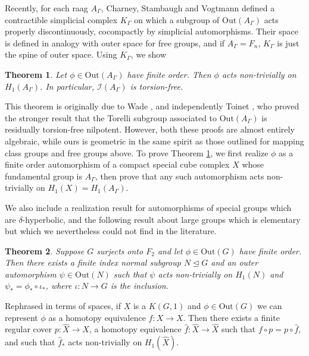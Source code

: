 \documentclass[11pt]{amsart}
\newtheorem{thm}{Theorem}
\numberwithin{thm}{section}
\theoremstyle{remark}
\theoremstyle{definition}
\newcommand{\Z}{\mathbb{Z}}
\newcommand{\Out}{\text{Out}}
\newcommand{\what}{\widehat}
\newcommand{\Tor}{\mathcal{I}}
\begin{document}
Recently, for each raag $A_\Gamma$, Charney, Stambaugh and Vogtmann \cite{CSV12} defined a contractible simplicial complex $K_\Gamma$ on which a subgroup of $\Out(A_\Gamma)$ acts properly discontinuously, cocompactly by simplicial automorphisms.  Their space is defined in analogy with outer space for free groups, and if $A_\Gamma=F_n$, $K_\Gamma$ is just the spine of outer space.  Using $K_\Gamma$, we show
\begin{thm}\label{main2} Let $\phi\in \Out(A_\Gamma)$ have finite order.  Then $\phi$ acts non-trivially on $H_1(A_\Gamma)$. In particular, $\Tor(A_\Gamma)$ is torsion-free.  
\end{thm}
This theorem is originally due to Wade \cite{Wa13}, and independently Toinet \cite{To13}, who proved the stronger result that the Torelli subgroup associated to $\Out(A_\Gamma)$ is residually torsion-free nilpotent. However, both these proofs are almost entirely algebraic, while ours is geometric in the same spirit as those outlined for mapping class groups and free groups above. To prove Theorem \ref{main2}, we first realize $\phi$ as a finite order automorphism of a compact special cube complex $X$ whose fundamental group is $A_\Gamma$, then prove that any such automorphism acts non-trivially on $H_1(X)=H_1(A_\Gamma)$. 

We also include a realization result for automorphisms of special groups which are $\delta$-hyperbolic, and the following result about large groups which is elementary but which we nevertheless could not find in the literature.    
\begin{thm} \label{main3}Suppose $G$ surjects onto $F_2$ and let $\phi\in \Out(G)$ have finite order.  Then there exists a finite index normal subgroup $N\trianglelefteq G$ and an outer automorphism $\psi \in \Out(N)$ such that $\psi$ acts non-trivially on $H_1(N)$ and $\psi_*=\phi_*\circ\iota_*$, where $\iota:N\rightarrow G$ is the inclusion.
\end{thm}
Rephrased in terms of spaces, if $X$ is a $K(G,1)$ and $\phi \in \Out(G)$ we can represent $\phi$ as a homotopy equivalence $f:X\rightarrow X$.  Then there exists a finite regular cover $p:\what{X}\rightarrow X$, a homotopy equivalence $\what{f}:\what{X}\rightarrow \what{X}$ such that $f\circ p= p\circ \what{f}$, and such that $\what{f}_*$ acts non-trivially on $H_1(\what{X})$.  
\\
\end{document}
